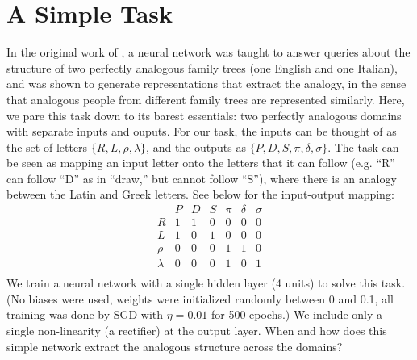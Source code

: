 \documentclass[10pt,letterpaper]{article}
\begin{document}
\section{A Simple Task}
In the original work of \citet{Hinton1986}, a neural network was taught to answer queries about the structure of two perfectly analogous family trees (one English and one Italian), and was shown to generate representations that extract the analogy, in the sense that analogous people from different family trees are represented similarly. Here, we pare this task down to its barest essentials: two perfectly analogous domains with separate inputs and ouputs. For our task, the inputs can be thought of as the set of letters \(\{R,L,\rho,\lambda\}\), and the outputs as \(\{P,D,S,\pi,\delta,\sigma\}\). The task can be seen as mapping an input letter onto the letters that it can follow (e.g. ``R'' can follow ``D'' as in ``draw,'' but cannot follow ``S''), where there is an analogy between the Latin and Greek letters. See below for the input-output mapping: 
\[
\begin{array}{c|cccccc} 
& P & D & S & \pi & \delta & \sigma \\
\hline
R & 1 & 1 & 0 & 0 & 0 & 0 \\
L & 1 & 0 & 1 & 0 & 0 & 0 \\
\rho & 0 & 0 & 0 & 1 & 1 & 0\\
\lambda & 0 & 0 & 0 & 1 & 0 & 1\\
\end{array} 
\]
We train a neural network with a single hidden layer (4 units) to solve this task. (No biases were used, weights were initialized randomly between 0 and 0.1, all training was done by SGD with \(\eta = 0.01\) for 500 epochs.) We include only a single non-linearity (a rectifier) at the output layer. When and how does this simple network extract the analogous structure across the domains? \par
\end{document}
